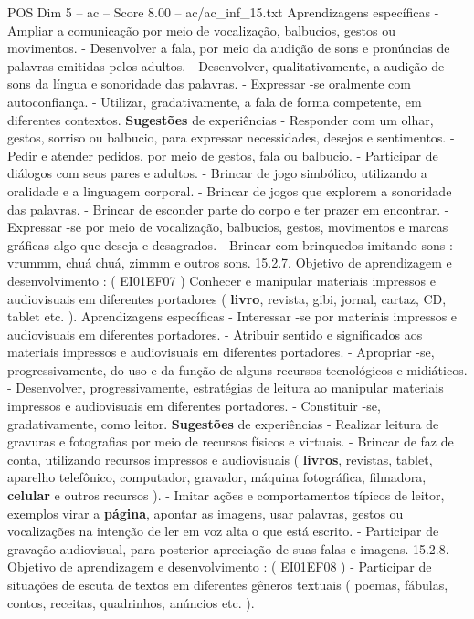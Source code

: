 \begin{textsample}{POS Dim 5 – ac – Score 8.00 – ac/ac\_inf\_15.txt}
Aprendizagens específicas - Ampliar a comunicação por meio de vocalização, balbucios, gestos ou movimentos. - Desenvolver a fala, por meio da audição de sons e pronúncias de palavras emitidas pelos adultos. - Desenvolver, qualitativamente, a audição de sons da língua e sonoridade das palavras. - Expressar -se oralmente com autoconfiança. - Utilizar, gradativamente, a fala de forma competente, em diferentes contextos. \textbf{Sugestões} de experiências - Responder com um olhar, gestos, sorriso ou balbucio, para expressar necessidades, desejos e sentimentos. - Pedir e atender pedidos, por meio de gestos, fala ou balbucio. - Participar de diálogos com seus pares e adultos. - Brincar de jogo simbólico, utilizando a oralidade e a linguagem corporal. - Brincar de jogos que explorem a sonoridade das palavras. - Brincar de esconder parte do corpo e ter prazer em encontrar. - Expressar -se por meio de vocalização, balbucios, gestos, movimentos e marcas gráficas algo que deseja e desagrados. - Brincar com brinquedos imitando sons : vrummm, chuá chuá, zimmm e outros sons. 15.2.7.
Objetivo de aprendizagem e desenvolvimento : ( EI01EF07 ) Conhecer e manipular materiais impressos e audiovisuais em diferentes portadores ( \textbf{livro}, revista, gibi, jornal, cartaz, CD, tablet etc. ).
Aprendizagens específicas - Interessar -se por materiais impressos e audiovisuais em diferentes portadores. - Atribuir sentido e significados aos materiais impressos e audiovisuais em diferentes portadores. - Apropriar -se, progressivamente, do uso e da função de alguns recursos tecnológicos e midiáticos. - Desenvolver, progressivamente, estratégias de leitura ao manipular materiais impressos e audiovisuais em diferentes portadores. - Constituir -se, gradativamente, como leitor. \textbf{Sugestões} de experiências - Realizar leitura de gravuras e fotografias por meio de recursos físicos e virtuais. - Brincar de faz de conta, utilizando recursos impressos e audiovisuais ( \textbf{livros}, revistas, tablet, aparelho telefônico, computador, gravador, máquina fotográfica, filmadora, \textbf{celular} e outros recursos ). - Imitar ações e comportamentos típicos de leitor, exemplos virar a \textbf{página}, apontar as imagens, usar palavras, gestos ou vocalizações na intenção de ler em voz alta o que está escrito. - Participar de gravação audiovisual, para posterior apreciação de suas falas e imagens. 15.2.8.
Objetivo de aprendizagem e desenvolvimento : ( EI01EF08 ) - Participar de situações de escuta de textos em diferentes gêneros textuais ( poemas, fábulas, contos, receitas, quadrinhos, anúncios etc. ).

\end{textsample}
